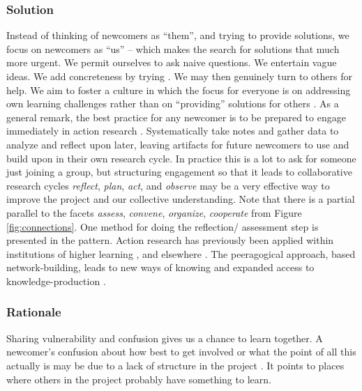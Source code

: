 \subsubsection*{Solution}

Instead of thinking of newcomers as ``them'', and trying to provide
solutions, we focus on newcomers as ``us'' -- which makes the search
for solutions that much more urgent.  We permit ourselves to ask naive
questions.  We entertain vague ideas.  We add concreteness by trying
.  We may then genuinely turn to
others for help.
We aim to foster a culture in which the focus for everyone is on
addressing own learning challenges rather than on ``providing''
solutions for others \cite{boud2005peer}.
%
As a general remark, the best practice for any newcomer is to be
prepared to engage immediately in action research
\cite{lewin1946action}.  Systematically take notes and gather data to
analyze and reflect upon later, leaving artifacts for future newcomers
to use and build upon in their own research cycle.  In practice this is a
lot to ask for someone just joining a group, but structuring
engagement so that it leads to collaborative research cycles
\emph{reflect}, \emph{plan}, \emph{act}, and \emph{observe} may be a
very effective way to improve the project and our collective
understanding.
Note that there is a partial parallel to the facets \emph{assess},
\emph{convene}, \emph{organize}, \emph{cooperate} from Figure
\ref{fig:connections}.  One method for doing the reflection\slash
assessment step is presented in the  pattern.
Action research has previously been applied within institutions of
higher learning \cite{action-research-OU}, and elsewhere
\cite{trist1951some,bergold2012participatory}.
%
The peeragogical approach, based network-building,
leads to new ways of knowing and expanded access to
knowledge-production \cite{gilbert2012being,wagner2008new}.


%
\subsubsection*{Rationale} 
%
Sharing vulnerability and confusion gives us a chance to learn
together.  A newcomer's confusion about how best to get involved or
what the point of all this actually is may be due to a lack of
structure in the project .  It points to places
where others in the project probably have something to learn.
%

